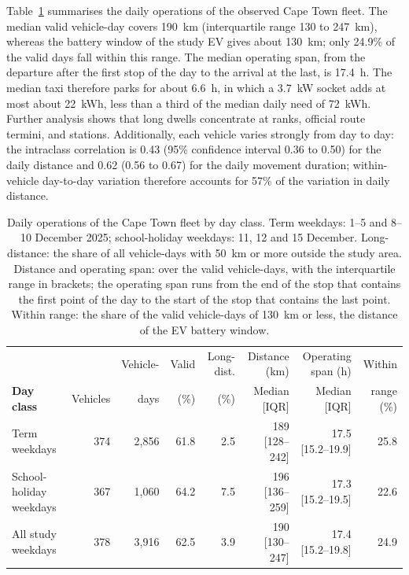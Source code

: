 \documentclass{elsarticle}
\begin{document}
Table~\ref{tab:cpt_fleet_summary} summarises the daily operations of the observed Cape Town fleet. The median valid vehicle-day covers 190~km (interquartile range 130 to 247~km), whereas the battery window of the study EV gives about 130~km; only 24.9\% of the valid days fall within this range. The median operating span, from the departure after the first stop of the day to the arrival at the last, is 17.4~h. The median taxi therefore parks for about 6.6~h, in which a 3.7~kW socket adds at most about 22~kWh, less than a third of the median daily need of 72~kWh. Further analysis shows that long dwells concentrate at ranks, official route termini, and stations. Additionally, each vehicle varies strongly from day to day: the intraclass correlation is 0.43 (95\% confidence interval 0.36 to 0.50) for the daily distance and 0.62 (0.56 to 0.67) for the daily movement duration; within-vehicle day-to-day variation therefore accounts for 57\% of the variation in daily distance.

\begin{table}[htbp]
    \centering
    \footnotesize
    \caption[Daily operations of the Cape Town fleet by day class]{Daily operations of the Cape Town fleet by day class. Term weekdays: 1--5 and 8--10 December 2025; school-holiday weekdays: 11, 12 and 15 December. Long-distance: the share of all vehicle-days with 50~km or more outside the study area. Distance and operating span: over the valid vehicle-days, with the interquartile range in brackets; the operating span runs from the end of the stop that contains the first point of the day to the start of the stop that contains the last point. Within range: the share of the valid vehicle-days of 130~km or less, the distance of the EV battery window.}
    \label{tab:cpt_fleet_summary}
    \begin{tabular}{@{}lrrrrrrr@{}}
        \toprule
        & & Vehicle- & Valid & Long-dist. & Distance (km) & Operating span (h) & Within \\
        \textbf{Day class} & Vehicles & days & (\%) & (\%) & Median [IQR] & Median [IQR] & range (\%) \\
        \midrule
        Term weekdays & 374 & 2,856 & 61.8 & 2.5 & 189 [128--242] & 17.5 [15.2--19.9] & 25.8 \\
        School-holiday weekdays & 367 & 1,060 & 64.2 & 7.5 & 196 [136--259] & 17.3 [15.2--19.5] & 22.6 \\
        All study weekdays & 378 & 3,916 & 62.5 & 3.9 & 190 [130--247] & 17.4 [15.2--19.8] & 24.9 \\
        \bottomrule
    \end{tabular}
\end{table}
\end{document}
